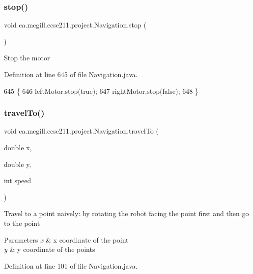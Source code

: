 \subsubsection{\texorpdfstring{stop()}{stop()}}
{\footnotesize\ttfamily void ca.\+mcgill.\+ecse211.\+project.\+Navigation.\+stop (\begin{DoxyParamCaption}{ }\end{DoxyParamCaption})}

Stop the motor 

Definition at line 645 of file Navigation.\+java.


\begin{DoxyCode}
645                      \{
646     leftMotor.stop(\textcolor{keyword}{true});
647     rightMotor.stop(\textcolor{keyword}{false});
648   \}
\end{DoxyCode}
\mbox{\label{classca_1_1mcgill_1_1ecse211_1_1project_1_1_navigation_a3d8354490a2d8c36090d794c25d33421}} 
\subsubsection{\texorpdfstring{travel\+To()}{travelTo()}}
{\footnotesize\ttfamily void ca.\+mcgill.\+ecse211.\+project.\+Navigation.\+travel\+To (\begin{DoxyParamCaption}\item[{double}]{x,  }\item[{double}]{y,  }\item[{int}]{speed }\end{DoxyParamCaption})}

Travel to a point naively\+: by rotating the robot facing the point first and then go to the point


\begin{DoxyParams}{Parameters}
{\em x} & x coordinate of the point \\
\hline
{\em y} & y coordinate of the points \\
\hline
\end{DoxyParams}


Definition at line 101 of file Navigation.\+java.


